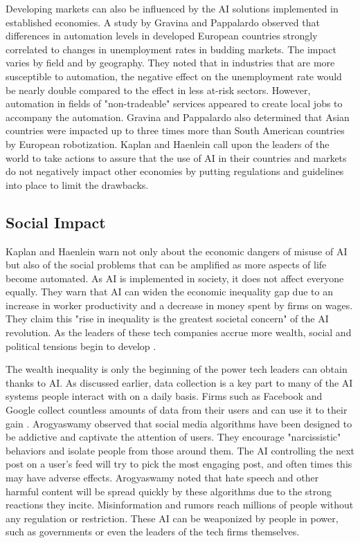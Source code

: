\documentclass[12pt, man]{apa6}
\begin{document}
Developing markets can also be influenced by the AI solutions implemented in established economies.  A study by Gravina and Pappalardo \parencite*{Gravina2022} observed that differences in automation levels in developed European countries strongly correlated to changes in unemployment rates in budding markets.  The impact varies by field and by geography.  They noted that in industries that are more susceptible to automation, the negative effect on the unemployment rate would be nearly double compared to the effect in less at-risk sectors.  However, automation in fields of "non-tradeable" services appeared to create local jobs to accompany the automation. Gravina and Pappalardo also determined that Asian countries were impacted up to three times more than South American countries by European robotization.  Kaplan and Haenlein \parencite*{Kaplan2020} call upon the leaders of the world to take actions to assure that the use of AI in their countries and markets do not negatively impact other economies by putting regulations and guidelines into place to limit the drawbacks.

\subsection*{Social Impact}
Kaplan and Haenlein \parencite*{Kaplan2020} warn not only about the economic dangers of misuse of AI but also of the social problems that can be amplified as more aspects of life become automated.  As AI is implemented in society, it does not affect everyone equally.  They warn that AI can widen the economic inequality gap due to an increase in worker productivity and a decrease in money spent by firms on wages.  They claim this "rise in inequality is the greatest societal concern" of the AI revolution.  As the leaders of these tech companies accrue more wealth, social and political tensions begin to develop \parencite{Arogyaswamy2020}.

The wealth inequality is only the beginning of the power tech leaders can obtain thanks to AI.  As discussed earlier, data collection is a key part to many of the AI systems people interact with on a daily basis.  Firms such as Facebook and Google collect countless amounts of data from their users and can use it to their gain \parencite{Arogyaswamy2020}.  Arogyaswamy \parencite*{Arogyaswamy2020} observed that social media algorithms have been designed to be addictive and captivate the attention of users.  They encourage "narcissistic" behaviors and isolate people from those around them.  The AI controlling the next post on a user's feed will try to pick the most engaging post, and often times this may have adverse effects.  Arogyaswamy \parencite*{Arogyaswamy2020} noted that hate speech and other harmful content will be spread quickly by these algorithms due to the strong reactions they incite.  Misinformation and rumors reach millions of people without any regulation or restriction.  These AI can be weaponized by people in power, such as governments or even the leaders of the tech firms themselves.
\end{document}
